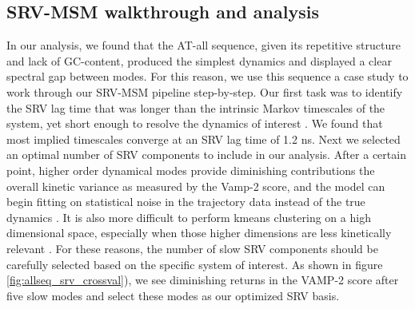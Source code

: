 \documentclass[journal=jpcbfk,manuscript=article]{achemso}
\begin{document}
\subsection{SRV-MSM walkthrough and analysis}
In our analysis, we found that the AT-all sequence, given its repetitive structure and lack of GC-content, produced the simplest dynamics and displayed a clear spectral gap between modes. For this reason, we use this sequence a case study to work through our SRV-MSM pipeline step-by-step. Our first task was to identify the SRV lag time that was longer than the intrinsic Markov timescales of the system, yet short enough to resolve the dynamics of interest \citep{Phys2018MarkovValidation}. We found that most implied timescales converge at an SRV lag time of 1.2 ns. Next we selected an optimal number of SRV components to include in our analysis. After a certain point, higher order dynamical modes provide diminishing contributions the overall kinetic variance as measured by the Vamp-2 score, and the model can begin fitting on statistical noise in the trajectory data instead of the true dynamics \citep{McGibbon2015VariationalKinetics}. It is also more difficult to perform kmeans clustering on a high dimensional space, especially when those higher dimensions are less kinetically relevant \citep{Pande2010EverythingAsk}. For these reasons, the number of slow SRV components should be carefully selected based on the specific system of interest. As shown in figure \ref{fig:allseq_srv_crossval}), we see diminishing returns in the VAMP-2 score after five slow modes and select these modes as our optimized SRV basis.
\end{document}
